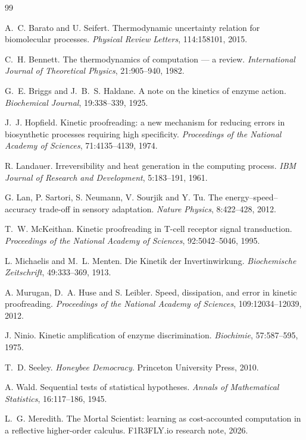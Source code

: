 \documentclass[11pt]{article}
\theoremstyle{plain}
\theoremstyle{definition}
\theoremstyle{remark}
\begin{document}
\begin{thebibliography}{99}

 A.~C. Barato and U. Seifert.
  Thermodynamic uncertainty relation for biomolecular processes.
  \emph{Physical Review Letters}, 114:158101, 2015.

 C.~H. Bennett.
  The thermodynamics of computation --- a review.
  \emph{International Journal of Theoretical Physics}, 21:905--940, 1982.

 G.~E. Briggs and J.~B.~S. Haldane.
  A note on the kinetics of enzyme action.
  \emph{Biochemical Journal}, 19:338--339, 1925.

 J.~J. Hopfield.
  Kinetic proofreading: a new mechanism for reducing errors in biosynthetic
  processes requiring high specificity.
  \emph{Proceedings of the National Academy of Sciences}, 71:4135--4139, 1974.

 R. Landauer.
  Irreversibility and heat generation in the computing process.
  \emph{IBM Journal of Research and Development}, 5:183--191, 1961.

 G. Lan, P. Sartori, S. Neumann, V. Sourjik and Y. Tu.
  The energy--speed--accuracy trade-off in sensory adaptation.
  \emph{Nature Physics}, 8:422--428, 2012.

 T.~W. McKeithan.
  Kinetic proofreading in T-cell receptor signal transduction.
  \emph{Proceedings of the National Academy of Sciences}, 92:5042--5046, 1995.

 L. Michaelis and M.~L. Menten.
  Die Kinetik der Invertinwirkung.
  \emph{Biochemische Zeitschrift}, 49:333--369, 1913.

 A. Murugan, D.~A. Huse and S. Leibler.
  Speed, dissipation, and error in kinetic proofreading.
  \emph{Proceedings of the National Academy of Sciences}, 109:12034--12039,
  2012.

 J. Ninio.
  Kinetic amplification of enzyme discrimination.
  \emph{Biochimie}, 57:587--595, 1975.

 T.~D. Seeley.
  \emph{Honeybee Democracy}. Princeton University Press, 2010.

 A. Wald.
  Sequential tests of statistical hypotheses.
  \emph{Annals of Mathematical Statistics}, 16:117--186, 1945.

 L.~G. Meredith.
  The Mortal Scientist: learning as cost-accounted computation in a reflective
  higher-order calculus. F1R3FLY.io research note, 2026.


\end{thebibliography}
\end{document}
